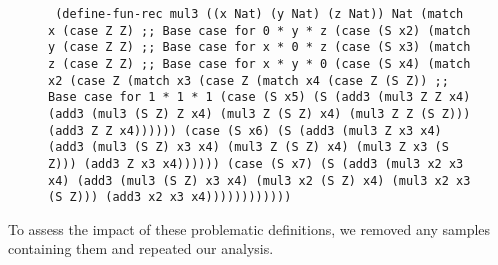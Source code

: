 \begin{figure}
  \texttt{
    (define-fun-rec mul3 ((x Nat) (y Nat) (z Nat)) Nat
      (match x
        (case Z Z)                          ;; Base case for 0 * y * z
        (case (S x2)
          (match y
            (case Z Z)                      ;; Base case for x * 0 * z
            (case (S x3)
              (match z
                (case Z Z)                  ;; Base case for x * y * 0
                (case (S x4)
                  (match x2
                    (case Z
                      (match x3
                        (case Z
                          (match x4
                            (case Z (S Z))  ;; Base case for 1 * 1 * 1
                            (case (S x5)
                              (S (add3 (mul3 Z Z x4)
                                       (add3 (mul3 (S Z) Z x4)
                                             (mul3 Z (S Z) x4)
                                             (mul3 Z Z (S Z)))
                                       (add3 Z Z x4))))))
                        (case (S x6)
                          (S (add3 (mul3 Z x3 x4)
                                   (add3 (mul3 (S Z) x3 x4)
                                         (mul3 Z (S Z) x4)
                                         (mul3 Z x3 (S Z)))
                                   (add3 Z x3 x4))))))
                    (case (S x7)
                      (S (add3 (mul3 x2 x3 x4)
                               (add3 (mul3 (S Z) x3 x4)
                                     (mul3 x2 (S Z) x4)
                                     (mul3 x2 x3 (S Z)))
                               (add3 x2 x3 x4))))))))))))
  }
  \label{fig:faildefs}
\end{figure}

To assess the impact of these problematic definitions, we removed any samples
containing them and repeated our analysis.
